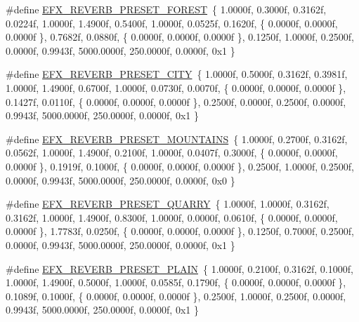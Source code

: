 \begin{DoxyCompactItemize}
\item 
\#define \mbox{\hyperlink{efx-presets_8h_a94d24ea2fae4d12deed381cc84f67449}{E\+F\+X\+\_\+\+R\+E\+V\+E\+R\+B\+\_\+\+P\+R\+E\+S\+E\+T\+\_\+\+F\+O\+R\+E\+ST}}~\{ 1.\+0000f, 0.\+3000f, 0.\+3162f, 0.\+0224f, 1.\+0000f, 1.\+4900f, 0.\+5400f, 1.\+0000f, 0.\+0525f, 0.\+1620f, \{ 0.\+0000f, 0.\+0000f, 0.\+0000f \}, 0.\+7682f, 0.\+0880f, \{ 0.\+0000f, 0.\+0000f, 0.\+0000f \}, 0.\+1250f, 1.\+0000f, 0.\+2500f, 0.\+0000f, 0.\+9943f, 5000.\+0000f, 250.\+0000f, 0.\+0000f, 0x1 \}
\item 
\#define \mbox{\hyperlink{efx-presets_8h_acc2f97a2e86723624bff8abd909ddc0c}{E\+F\+X\+\_\+\+R\+E\+V\+E\+R\+B\+\_\+\+P\+R\+E\+S\+E\+T\+\_\+\+C\+I\+TY}}~\{ 1.\+0000f, 0.\+5000f, 0.\+3162f, 0.\+3981f, 1.\+0000f, 1.\+4900f, 0.\+6700f, 1.\+0000f, 0.\+0730f, 0.\+0070f, \{ 0.\+0000f, 0.\+0000f, 0.\+0000f \}, 0.\+1427f, 0.\+0110f, \{ 0.\+0000f, 0.\+0000f, 0.\+0000f \}, 0.\+2500f, 0.\+0000f, 0.\+2500f, 0.\+0000f, 0.\+9943f, 5000.\+0000f, 250.\+0000f, 0.\+0000f, 0x1 \}
\item 
\#define \mbox{\hyperlink{efx-presets_8h_a01a4fbb51046564e360a027fb499f26e}{E\+F\+X\+\_\+\+R\+E\+V\+E\+R\+B\+\_\+\+P\+R\+E\+S\+E\+T\+\_\+\+M\+O\+U\+N\+T\+A\+I\+NS}}~\{ 1.\+0000f, 0.\+2700f, 0.\+3162f, 0.\+0562f, 1.\+0000f, 1.\+4900f, 0.\+2100f, 1.\+0000f, 0.\+0407f, 0.\+3000f, \{ 0.\+0000f, 0.\+0000f, 0.\+0000f \}, 0.\+1919f, 0.\+1000f, \{ 0.\+0000f, 0.\+0000f, 0.\+0000f \}, 0.\+2500f, 1.\+0000f, 0.\+2500f, 0.\+0000f, 0.\+9943f, 5000.\+0000f, 250.\+0000f, 0.\+0000f, 0x0 \}
\item 
\#define \mbox{\hyperlink{efx-presets_8h_a75ff37a6a3dba17f608feecd3e3b7a3f}{E\+F\+X\+\_\+\+R\+E\+V\+E\+R\+B\+\_\+\+P\+R\+E\+S\+E\+T\+\_\+\+Q\+U\+A\+R\+RY}}~\{ 1.\+0000f, 1.\+0000f, 0.\+3162f, 0.\+3162f, 1.\+0000f, 1.\+4900f, 0.\+8300f, 1.\+0000f, 0.\+0000f, 0.\+0610f, \{ 0.\+0000f, 0.\+0000f, 0.\+0000f \}, 1.\+7783f, 0.\+0250f, \{ 0.\+0000f, 0.\+0000f, 0.\+0000f \}, 0.\+1250f, 0.\+7000f, 0.\+2500f, 0.\+0000f, 0.\+9943f, 5000.\+0000f, 250.\+0000f, 0.\+0000f, 0x1 \}
\item 
\#define \mbox{\hyperlink{efx-presets_8h_a4f25fa872d6ae85b7013d23b31ab7852}{E\+F\+X\+\_\+\+R\+E\+V\+E\+R\+B\+\_\+\+P\+R\+E\+S\+E\+T\+\_\+\+P\+L\+A\+IN}}~\{ 1.\+0000f, 0.\+2100f, 0.\+3162f, 0.\+1000f, 1.\+0000f, 1.\+4900f, 0.\+5000f, 1.\+0000f, 0.\+0585f, 0.\+1790f, \{ 0.\+0000f, 0.\+0000f, 0.\+0000f \}, 0.\+1089f, 0.\+1000f, \{ 0.\+0000f, 0.\+0000f, 0.\+0000f \}, 0.\+2500f, 1.\+0000f, 0.\+2500f, 0.\+0000f, 0.\+9943f, 5000.\+0000f, 250.\+0000f, 0.\+0000f, 0x1 \}
\item 

\end{DoxyCompactItemize}
